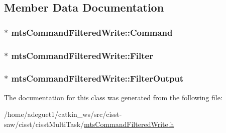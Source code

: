 \subsection{Member Data Documentation}
\hypertarget{classmts_command_filtered_write_a58cf3073e6fbdf0874d8aa369d3500cd}{
\subsubsection[{Command}]{$\ast$ mts\-Command\-Filtered\-Write\-::\-Command\hspace{0.3cm}{\ttfamily [protected]}}}\label{classmts_command_filtered_write_a58cf3073e6fbdf0874d8aa369d3500cd}
\hypertarget{classmts_command_filtered_write_afbf763a5226ddc747f8dd25219b2e027}{
\subsubsection[{Filter}]{$\ast$ mts\-Command\-Filtered\-Write\-::\-Filter\hspace{0.3cm}{\ttfamily [protected]}}}\label{classmts_command_filtered_write_afbf763a5226ddc747f8dd25219b2e027}
\hypertarget{classmts_command_filtered_write_a87da9e319a6eb2fe6f4ca23efbf59bce}{
\subsubsection[{Filter\-Output}]{$\ast$ mts\-Command\-Filtered\-Write\-::\-Filter\-Output\hspace{0.3cm}{\ttfamily [protected]}}}\label{classmts_command_filtered_write_a87da9e319a6eb2fe6f4ca23efbf59bce}


The documentation for this class was generated from the following file\-:\begin{DoxyCompactItemize}
\item 
/home/adeguet1/catkin\-\_\-ws/src/cisst-\/saw/cisst/cisst\-Multi\-Task/\hyperlink{mts_command_filtered_write_8h}{mts\-Command\-Filtered\-Write.\-h}\end{DoxyCompactItemize}
